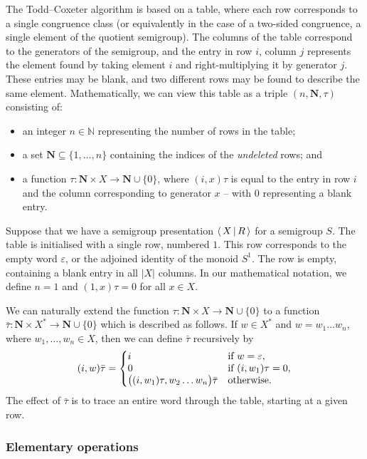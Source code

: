 The Todd--Coxeter algorithm is based on a table, where each row corresponds to a
single congruence class (or equivalently in the case of a two-sided congruence,
a single element of the quotient
semigroup).  The columns of the table correspond to the generators of the
semigroup, and the entry in row $i$, column $j$ represents the element found by
taking element $i$ and right-multiplying it by generator $j$.  These entries may
be blank, and two different rows may be found to describe the same element.
Mathematically, we can view this table as a triple $(n, \mathbf{N}, \tau)$
consisting of:
\begin{itemize}
\item an integer $n \in \mathbb{N}$ representing the number of rows in the table;
\item a set $\mathbf{N} \subseteq \{1, \ldots, n\}$ containing the indices of the
  \textit{undeleted} rows; and
\item a function $\tau: \mathbf{N} \times X \to \mathbf{N} \cup \{0\}$, where
  $(i, x)\tau$ is equal to the entry in row $i$ and the column corresponding to
  generator $x$ -- with $0$ representing a blank entry.
\end{itemize}

Suppose that we have a semigroup presentation $\left\langle \, X \, \middle| \, R \, \right\rangle$ for a semigroup
$S$.  The table is initialised with a single row, numbered $1$.  This row
corresponds to the empty word $\varepsilon$, or the adjoined identity of the
monoid $S^1$.  The row is empty, containing a blank entry in all $|X|$ columns.
In our mathematical notation, we define $n=1$ and
$(1,x)\tau = 0$ for all $x \in X$.

We can naturally extend the function
$\tau: \mathbf{N} \times X \to \mathbf{N} \cup \{0\}$
to a function
$\bar{\tau}: \mathbf{N} \times X^* \to \mathbf{N} \cup \{0\}$
which is described as follows.
If $w \in X^*$ and $w=w_1 \ldots w_n$, where $w_1, \ldots, w_n \in X$,
then we can define $\bar\tau$ recursively by
$$
(i, w)\bar\tau = \left\{
\begin{matrix*}[l]
  i & \textnormal{if~} w=\varepsilon,\\
  0 & \textnormal{if~} (i, w_1)\tau=0,\\
  \big((i, w_1)\tau, w_2 \ldots w_n\big)\bar\tau & \textnormal{otherwise}.
\end{matrix*} \right.
$$
The effect of $\bar\tau$ is to trace an entire word through the table, starting
at a given row.

\subsubsection{Elementary operations}

